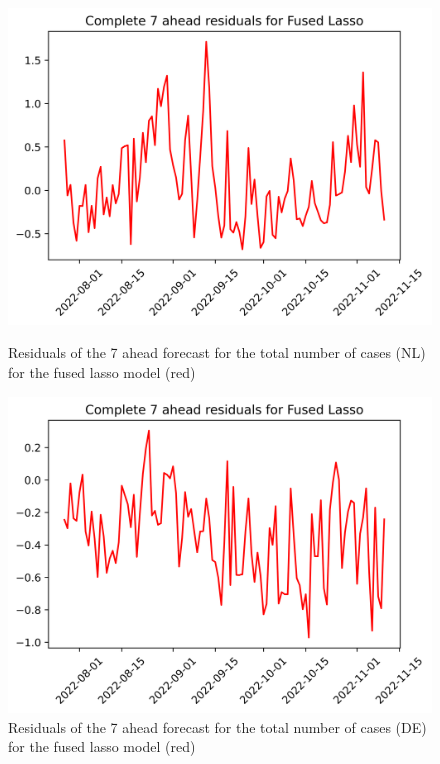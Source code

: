 \begin{figure}

\begin{minipage}{.45\textwidth}
  \centering
  \includegraphics[width=\linewidth]{pics/7_ah/7_ahead_errors_Fused Lasso.png}
  \caption{Residuals of the 7 ahead forecast for the total number of cases (NL) for the fused lasso model (red)}
  \label{fig:tot_cases_error_7_flasso}
\end{minipage}
\begin{minipage}{.45\textwidth}
  \centering
  \includegraphics[width=\linewidth]{pics/7_ah/DE_7_ahead_errors_Fused Lasso.png}
  \caption{Residuals of the 7 ahead forecast for the total number of cases (DE) for the fused lasso model (red)}
  \label{fig:tot_cases_error_7_flasso_DE}
\end{minipage}

\end{figure}
